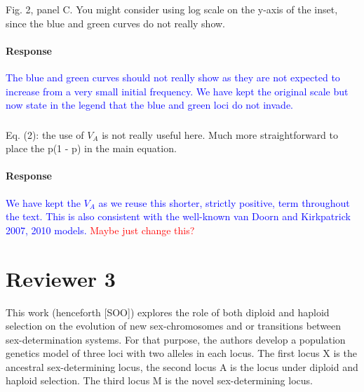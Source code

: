 \documentclass[10pt,letterpaper]{article}
\begin{document}
\noindent\subsubsection{}
Fig. 2, panel C. You might consider using log scale on the y-axis of the inset, since the blue and green curves do not really show.

\noindent\paragraph{Response}
\textcolor{blue}{The blue and green curves should not really show as they are not expected to increase from a very small initial frequency. We have kept the original scale but now state in the legend that the blue and green loci do not invade.}

\noindent\subsubsection{}
Eq. (2): the use of $V_A$ is not really useful here. Much more straightforward to place the p(1 - p) in the main equation.

\noindent\paragraph{Response}
\textcolor{blue}{We have kept the $V_A$ as we reuse this shorter, strictly positive, term throughout the text. This is also consistent with the well-known van Doorn and Kirkpatrick 2007, 2010 models.}
\textcolor{red}{Maybe just change this?}

\section{Reviewer 3}

This work (henceforth [SOO]) explores the role of both diploid and haploid selection on the evolution of new sex-chromosomes and or transitions between sex-determination systems. For that purpose, the authors develop a population genetics model of three loci with two alleles in each locus. The first locus X is the ancestral sex-determining locus, the second locus A is the locus under diploid and haploid selection. The third locus M is the novel sex-determining locus.
\end{document}
